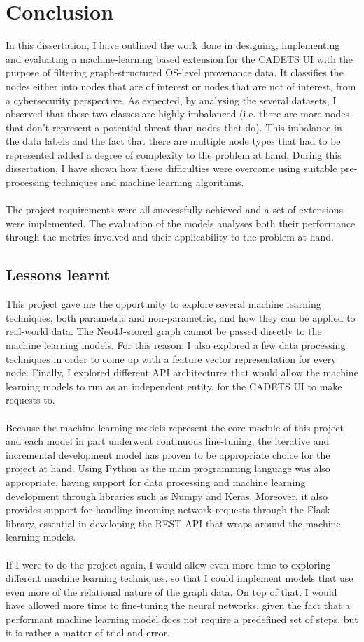 
	\chapter{Conclusion}
		In this dissertation, I have outlined the work done in designing, implementing and evaluating a machine-learning based extension for the CADETS UI with the purpose of filtering graph-structured OS-level provenance data. It classifies the nodes either into nodes that are of interest or nodes that are not of interest, from a cybersecurity perspective. As expected, by analysing the several datasets, I observed that these two classes are highly imbalanced (i.e. there are more nodes that don't represent a potential threat than nodes that do). This imbalance in the data labels and the fact that there are multiple node types that had to be represented added a degree of complexity to the problem at hand. During this dissertation, I have shown how these difficulties were overcome using suitable pre-processing techniques and machine learning algorithms. 
		\\ \\
		The project requirements were all successfully achieved and a set of extensions were implemented. The evaluation of the models analyses both their performance through the metrics involved and their applicability to the problem at hand. 
		
	\section{Lessons learnt} 
		This project gave me the opportunity to explore several machine learning techniques, both parametric and non-parametric, and how they can be applied to real-world data. The Neo4J-stored graph cannot be passed directly to the machine learning models. For this reason, I also explored a few data processing techniques in order to come up with a feature vector representation for every node. Finally, I explored different API architectures that would allow the machine learning models to run as an independent entity, for the CADETS UI to make requests to.
		\\ \\
		Because the machine learning models represent the core module of this project and each model in part underwent continuous fine-tuning, the iterative and incremental development model has proven to be appropriate choice for the project at hand. Using Python as the main programming language was also appropriate, having support for data processing and machine learning development through libraries such as Numpy and Keras. Moreover, it also provides support for handling incoming network requests through the Flask library, essential in developing the REST API that wraps around the machine learning models.
		\\ \\
		If I were to do the project again, I would allow even more time to exploring different machine learning techniques, so that I could implement models that use even more of the relational nature of the graph data. On top of that, I would have allowed more time to fine-tuning the neural networks, given the fact that a performant machine learning model does not require a predefined set of steps, but it is rather a matter of trial and error.
